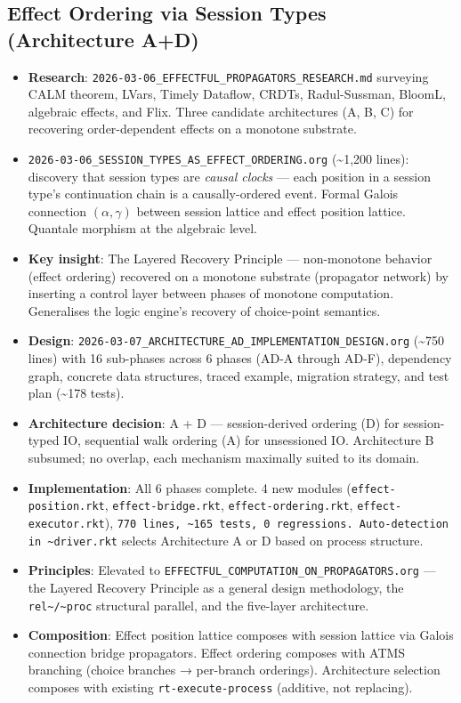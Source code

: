 \documentclass[11pt]{article}
\begin{document}
\subsection{Effect Ordering via Session Types (Architecture A+D)}
\label{sec:org0401db1}
\begin{itemize}
\item \textbf{Research}: \texttt{2026-03-06\_EFFECTFUL\_PROPAGATORS\_RESEARCH.md} surveying
CALM theorem, LVars, Timely Dataflow, CRDTs, Radul-Sussman, BloomL,
algebraic effects, and Flix. Three candidate architectures (A, B, C)
for recovering order-dependent effects on a monotone substrate.
\item \texttt{2026-03-06\_SESSION\_TYPES\_AS\_EFFECT\_ORDERING.org} (\textasciitilde{}1,200 lines):
discovery that session types are \emph{causal clocks} --- each position in
a session type's continuation chain is a causally-ordered event.
Formal Galois connection \((\alpha, \gamma)\) between session lattice
and effect position lattice. Quantale morphism at the algebraic level.
\item \textbf{Key insight}: The Layered Recovery Principle --- non-monotone behavior
(effect ordering) recovered on a monotone substrate (propagator network)
by inserting a control layer between phases of monotone computation.
Generalises the logic engine's recovery of choice-point semantics.
\item \textbf{Design}: \texttt{2026-03-07\_ARCHITECTURE\_AD\_IMPLEMENTATION\_DESIGN.org}
(\textasciitilde{}750 lines) with 16 sub-phases across 6 phases (AD-A through AD-F),
dependency graph, concrete data structures, traced example, migration
strategy, and test plan (\textasciitilde{}178 tests).
\item \textbf{Architecture decision}: A + D --- session-derived ordering (D) for
session-typed IO, sequential walk ordering (A) for unsessioned IO.
Architecture B subsumed; no overlap, each mechanism maximally suited
to its domain.
\item \textbf{Implementation}: All 6 phases complete. 4 new modules
(\texttt{effect-position.rkt}, \texttt{effect-bridge.rkt}, \texttt{effect-ordering.rkt},
\texttt{effect-executor.rkt}), \texttt{770 lines, \textasciitilde{}165 tests, 0 regressions.
  Auto-detection in \textasciitilde{}driver.rkt} selects Architecture A or D based on
process structure.
\item \textbf{Principles}: Elevated to \texttt{EFFECTFUL\_COMPUTATION\_ON\_PROPAGATORS.org}
--- the Layered Recovery Principle as a general design methodology,
the \texttt{rel\textasciitilde{}/\textasciitilde{}proc} structural parallel, and the five-layer architecture.
\item \textbf{Composition}: Effect position lattice composes with session lattice
via Galois connection bridge propagators. Effect ordering composes
with ATMS branching (choice branches → per-branch orderings).
Architecture selection composes with existing \texttt{rt-execute-process}
(additive, not replacing).
\end{itemize}
\end{document}
